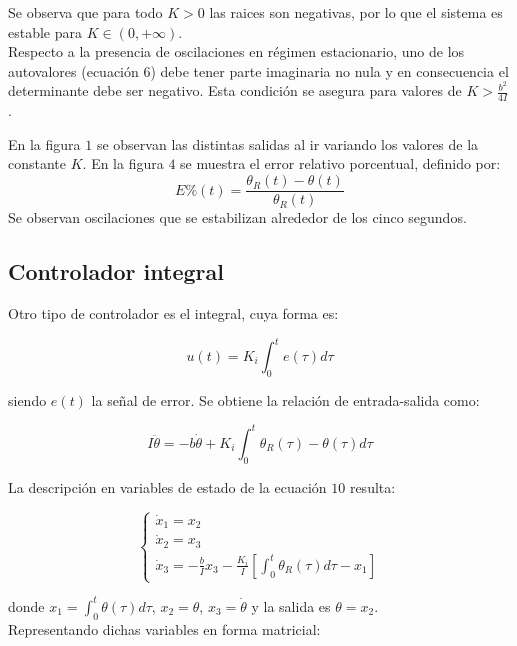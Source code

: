 \documentclass{sig-alternate}
\begin{document}
Se observa que para todo $K > 0$ las raices son negativas, por lo que el sistema 
es estable para $K \in (0,+\infty)$.\\
Respecto a la presencia de oscilaciones en r\'{e}gimen estacionario, uno de los 
autovalores (ecuaci\'on $6$) debe tener parte imaginaria no nula y en 
consecuencia el determinante debe ser negativo. Esta condici\'on se asegura 
para valores de $K > \frac{b^2}{4I}$. 

En la figura $1$ se observan las distintas salidas al ir variando los valores
de la constante $K$. En la figura $4$ se muestra el error relativo porcentual,
definido por:
\begin{equation}
\label{ecuacion_error_relativo_porcentual}
E\%(t)=\frac{\theta_{R}(t) - \theta(t)}{\theta_{R}(t)}
\end{equation}
Se observan oscilaciones que se estabilizan alrededor de los cinco segundos.

\subsection{Controlador integral}\label{integral}
Otro tipo de controlador es el integral, cuya forma es:

\begin{equation}
\label{error_modelo2}
u(t) = K_i \int_0^t e(\tau) d\tau
\end{equation}

siendo $e(t)$ la se\~nal de error. Se obtiene la relaci\'{o}n de
entrada-salida como:

\begin{equation}
\label{ecuacion_modelo2a}
I \ddot\theta = - b \dot\theta + K_i \int_0^t \theta_R(\tau) - \theta(\tau) d\tau
\end{equation}

La descripci\'{o}n en variables de estado de la ecuaci\'on $10$ resulta:

\begin{equation}
\label{var_estados_model2}
\begin{cases} 
    \dot x_1 = x_2 \\
    \dot x_2 = x_3 \\
    \dot x_3 = -\frac{b}{I} x_3 - \frac{K_i}{I} \left[ \int_0^t \theta_R(\tau) d\tau -x_1 \right]
\end{cases}
\end{equation}

donde $x_1 = \int_0^t \theta(\tau) d\tau$, $x_2 = \theta$, $x_3 = \dot \theta$ 
y la salida es $\theta=x_2$.\\
Representando dichas variables en forma matricial:
\end{document}
